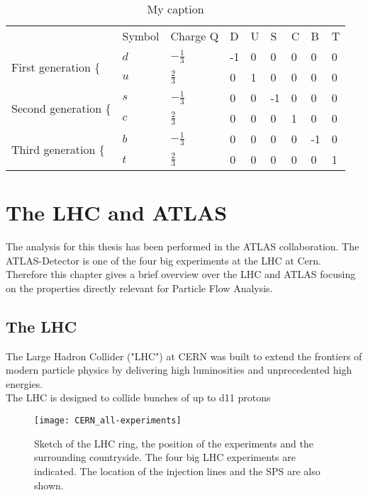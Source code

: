 \begin{table}[]
\centering
\caption{My caption}
\label{my-label}
\begin{tabular}{l|l|l|l|l|l|l|l|l|}
\cline{2-9}
                                      & Symbol & Charge Q       & D  & U & S  & C & B  & T \\ \cline{2-9} 
\multirow{2}{*}{First generation \{}  & $d$    & $-\frac{1}{3}$ & -1 & 0 & 0  & 0 & 0  & 0 \\ \cline{2-9} 
                                      & $u$    & $\frac{2}{3}$  & 0  & 1 & 0  & 0 & 0  & 0 \\ \cline{2-9} 
\multirow{2}{*}{Second generation \{} & $s$    & $-\frac{1}{3}$ & 0  & 0 & -1 & 0 & 0  & 0 \\ \cline{2-9} 
                                      & $c$    & $\frac{2}{3}$  & 0  & 0 & 0  & 1 & 0  & 0 \\ \cline{2-9} 
\multirow{2}{*}{Third generation \{}  & $b$    & $-\frac{1}{3}$ & 0  & 0 & 0  & 0 & -1 & 0 \\ \cline{2-9} 
                                      & $t$    & $\frac{2}{3}$  & 0  & 0 & 0  & 0 & 0  & 1 \\ \cline{2-9} 
\end{tabular}
\end{table}





\section{The LHC and ATLAS}

The analysis for this thesis has been performed in the ATLAS collaboration. The ATLAS-Detector is one of the four big experiments at the LHC at Cern. Therefore this chapter gives a brief overview over the LHC and ATLAS focusing on the properties directly relevant for Particle Flow Analysis.

\subsection{The LHC}

The Large Hadron Collider ("LHC") at CERN was built to extend the frontiers of modern particle physics by delivering high luminosities and unprecedented high energies.\\
The LHC is designed to collide bunches of up to \num{d11} protons
\begin{figure}[htbp]
  \centering
  \texttt{[image: CERN\_all-experiments]}
  \caption[Sketch of the LHC ring, the position of the experiments and
  the surrounding countryside.]{Sketch of the LHC ring, the position
    of the experiments and the surrounding countryside. The four big
    LHC experiments are indicated. The location of the injection lines
    and the SPS are also shown.}
  \label{fig:LHC}
\end{figure}


